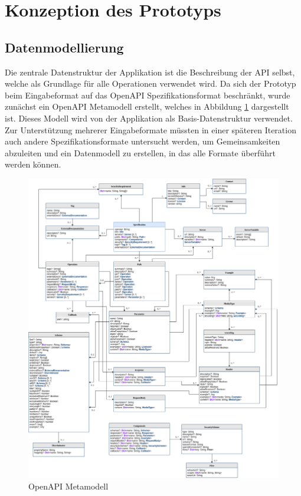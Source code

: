 
\section{Konzeption des Prototyps}


\subsection{Datenmodellierung}
\label{sec:datastructures}

Die zentrale Datenstruktur der Applikation ist die Beschreibung der API selbst, welche als Grundlage für alle Operationen verwendet wird. Da sich der Prototyp beim Eingabeformat auf das OpenAPI Spezifikationsformat beschränkt, wurde zunächst ein OpenAPI Metamodell erstellt, welches in Abbildung \ref{fig:openapi} dargestellt ist. Dieses Modell wird von der Applikation als Basis-Datenstruktur verwendet. Zur Unterstützung mehrerer Eingabeformate müssten in einer späteren Iteration auch andere Spezifikationsformate untersucht werden, um Gemeinsamkeiten abzuleiten und ein Datenmodell zu erstellen, in das alle Formate überführt werden können. \\

\begin{figure}
  \includegraphics[width=\textwidth,height=\textheight,keepaspectratio]{../images/open-api.png}
  \caption{OpenAPI Metamodell}
  \label{fig:openapi}
\end{figure}

